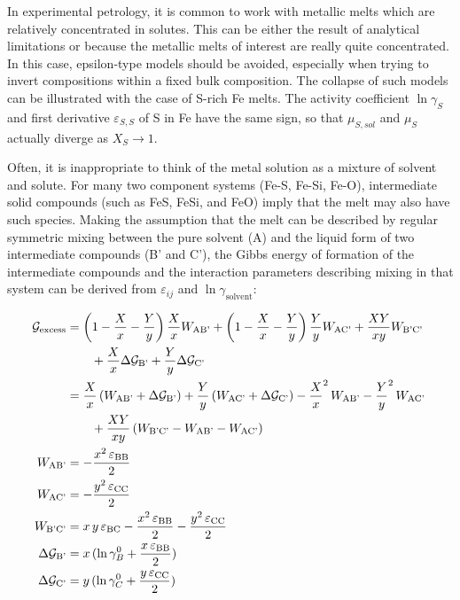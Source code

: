 \documentclass[11pt,a4paper,english]{article}
\begin{document}
In experimental petrology, it is common to work with metallic melts which are relatively concentrated in solutes. This can be either the result of analytical limitations or because the metallic melts of interest are really quite concentrated. In this case, epsilon-type models should be avoided, especially when trying to invert compositions within a fixed bulk composition. The collapse of such models can be illustrated with the case of S-rich Fe melts. The activity coefficient $\ln\gamma_S$ and first derivative $\varepsilon_{S,S}$ of S in Fe have the same sign, so that $\mu_{S,sol}$ and $\mu_{S}$ actually diverge as $X_S \rightarrow 1$. 

Often, it is inappropriate to think of the metal solution as a mixture of solvent and solute. For many two component systems (Fe-S, Fe-Si, Fe-O), intermediate solid compounds (such as FeS, FeSi, and FeO) imply that the melt may also have such species. Making the assumption that the melt can be described by regular symmetric mixing between the pure solvent (A) and the liquid form of two intermediate compounds (B' and C'), the Gibbs energy of formation of the intermediate compounds and the interaction parameters describing mixing in that system can be derived from $\varepsilon_{ij}$ and $\ln \gamma_{\textrm{solvent}}$:

\begin{align}
  &\begin{aligned}
     \mathllap{\mathcal{G}_{\textrm{excess}}} &= \left(1-\frac{X}{x}-\frac{Y}{y}\right)\frac{X}{x}W_{\textrm{AB'}} + \left(1-\frac{X}{x}-\frac{Y}{y}\right)\frac{Y}{y}W_{\textrm{AC'}} + \frac{XY}{xy}W_{\textrm{B'C'}} \\ 
     &\qquad +  \frac{X}{x} \Delta \mathcal{G}_{\textrm{B'}}  + \frac{Y}{y} \Delta \mathcal{G}_{\textrm{C'}}
   \end{aligned}\\
  &\begin{aligned}
     &= \frac{X}{x}\left(W_{\textrm{AB'}} + \Delta \mathcal{G}_{\textrm{B'}}\right) + \frac{Y}{y}\left(W_{\textrm{AC'}} + \Delta \mathcal{G}_{\textrm{C'}}\right) - \frac{X}{x}^2\, W_{\textrm{AB'}} - \frac{Y}{y}^2\, W_{\textrm{AC'}} \\
     &\qquad +  \frac{XY}{xy} \left( W_{\textrm{B'C'}} - W_{\textrm{AB'}} - W_{\textrm{AC'}} \right)
   \end{aligned} \\
  W_{\textrm{AB'}} &= -\frac{x^2\,\varepsilon_{\textrm{BB}}}{2} \\
  W_{\textrm{AC'}} &= -\frac{y^2\,\varepsilon_{\textrm{CC}}}{2} \\
  W_{\textrm{B'C'}} &= x\,y\,\varepsilon_{\textrm{BC}} -\frac{x^2\,\varepsilon_{\textrm{BB}}}{2} -\frac{y^2\,\varepsilon_{\textrm{CC}}}{2} \\
  \Delta \mathcal{G}_{\textrm{B'}} &= x\,(\ln \gamma^0_B + \frac{x\, \varepsilon_{\textrm{BB}}}{2} )\\
  \Delta \mathcal{G}_{\textrm{C'}} &= y\,(\ln \gamma^0_C + \frac{y\, \varepsilon_{\textrm{CC}}}{2} )
\end{align}
\end{document}
